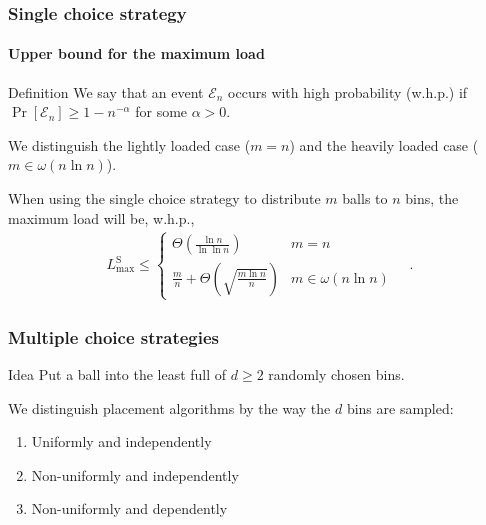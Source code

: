 \documentclass[serif,professionalfonts]{beamer}
\newcommand\load{L_{\mathrm{max}}}
\newcommand\loadS{\load^{\mathrm{S}}}
\begin{document}
\begin{frame}
\frametitle{Single choice strategy}
\framesubtitle{Upper bound for the maximum load}

\begin{exampleblock}{Definition}
We say that an event $\mathcal E_n$ occurs \alert{with high probability} (w.h.p.) if $\Pr\left[\mathcal E_n \right] \geq 1 - n^{-\alpha}$ for some $\alpha > 0$.
\end{exampleblock}

\pause
\medskip
We distinguish the \alert{lightly loaded} case ($m = n$) and the \alert{heavily loaded} case ($m \in \omega(n\ln n)$).

\medskip
\begin{theorem}
When using the \alert{single choice} strategy to distribute $m$ balls to $n$ bins, the maximum load will be, w.h.p.,
\begin{align*}
\loadS \leq 
	\begin{cases}
    \Theta\left(\frac{\ln n}{\ln\ln n}\right)           & m = n \\
    \frac{m}{n} + \Theta\left(\sqrt{\frac{m\ln n}{n}} \right)              & m \in \omega(n \ln n)
    \end{cases} \quad .
\end{align*}
\end{theorem}
\end{frame}

\begin{frame}
\frametitle{Multiple choice strategies}
\begin{exampleblock}{Idea}
Put a ball into the \alert{least full} of $d\geq2$ randomly chosen bins.
\end{exampleblock}

\bigskip
We distinguish placement algorithms by the way the $d$ \alert{bins are sampled}:
\begin{enumerate}
\item Uniformly and independently
\item Non-uniformly and independently
\item Non-uniformly and dependently
\end{enumerate}
\end{frame}
\end{document}
